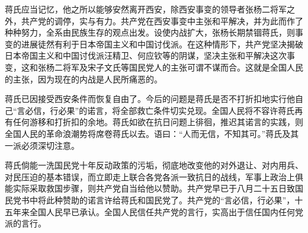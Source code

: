 蒋氏应当记忆，他之所以能够安然离开西安，除西安事变的领导者张杨二将军之外，共产党的调停，实与有力。共产党在西安事变中主张和平解决，并为此而作了种种努力，全系由民族生存的观点出发。设使内战扩大，张杨长期禁锢蒋氏，则事变的进展徒然有利于日本帝国主义和中国讨伐派。在这种情形下，共产党坚决揭破日本帝国主义和中国讨伐派汪精卫、何应钦等的阴谋，坚决主张和平解决这次事变，这和张杨二将军及宋子文氏等国民党人的主张可谓不谋而合。这就是全国人民的主张，因为现在的内战是人民所痛恶的。

蒋氏已因接受西安条件而恢复自由了。今后的问题是蒋氏是否不打折扣地实行他自己“言必信，行必果”的诺言，将全部救亡条件切实兑现。全国人民将不容许蒋氏再有任何游移和打折扣的余地。蒋氏如欲在抗日问题上徘徊，推迟其诺言的实践，则全国人民的革命浪潮势将席卷蒋氏以去。语曰：“人而无信，不知其可。”蒋氏及其一派必须深切注意。

蒋氏倘能一洗国民党十年反动政策的污垢，彻底地改变他的对外退让、对内用兵、对民压迫的基本错误，而立即走上联合各党各派一致抗日的战线，军事上政治上俱能实际采取救国步骤，则共产党自当给他以赞助。共产党早已于八月二十五日致国民党书中将此种赞助的诺言许给蒋氏和国民党了。共产党的“言必信，行必果”，十五年来全国人民早已承认。全国人民信任共产党的言行，实高出于信任国内任何党派的言行。


